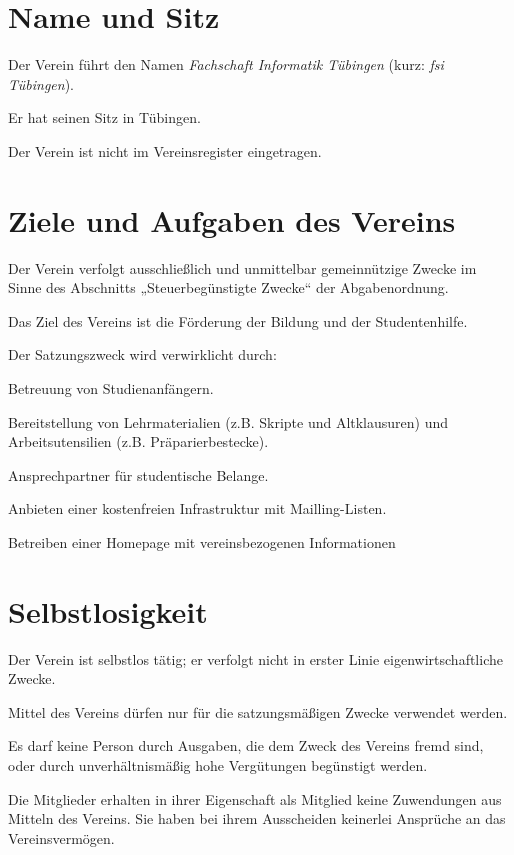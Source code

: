\section{Name und Sitz}
	\begin{myEnum}
		\item Der Verein führt den Namen \textit{Fachschaft Informatik Tübingen} (kurz: \textit{fsi Tübingen}).
		\item Er hat seinen Sitz in Tübingen. 
		\item Der Verein ist nicht im Vereinsregister eingetragen.
	\end{myEnum}
	
\section{Ziele und Aufgaben des Vereins}
	\begin{myEnum}
		\item Der Verein verfolgt ausschließlich und unmittelbar gemeinnützige Zwecke im Sinne des Abschnitts „Steuerbegünstigte Zwecke“ der Abgabenordnung.
		\item Das Ziel des Vereins ist die Förderung der Bildung und der Studentenhilfe.
		\item Der Satzungszweck wird verwirklicht durch:
			\begin{mySubEnum}
				\item Betreuung von Studienanfängern.
				\item Bereitstellung von Lehrmaterialien (z.B. Skripte und Altklausuren) und Arbeitsutensilien (z.B. Präparierbestecke).
				\item Ansprechpartner für studentische Belange.
				\item Anbieten einer kostenfreien Infrastruktur mit Mailling-Listen.
				\item Betreiben einer Homepage mit vereinsbezogenen Informationen
			\end{mySubEnum}
	\end{myEnum}

\section{Selbstlosigkeit}
	\begin{myEnum}
		\item Der Verein ist selbstlos tätig; er verfolgt nicht in erster Linie eigenwirtschaftliche Zwecke.
		\item Mittel des Vereins dürfen nur für die satzungsmäßigen Zwecke verwendet werden.
		\item Es darf keine Person durch Ausgaben, die dem Zweck des Vereins fremd sind, oder durch unverhältnismäßig hohe Vergütungen begünstigt werden.
		\item Die Mitglieder erhalten in ihrer Eigenschaft als Mitglied keine Zuwendungen aus Mitteln des Vereins. Sie haben bei ihrem Ausscheiden keinerlei Ansprüche an das Vereinsvermögen.
	\end{myEnum}
